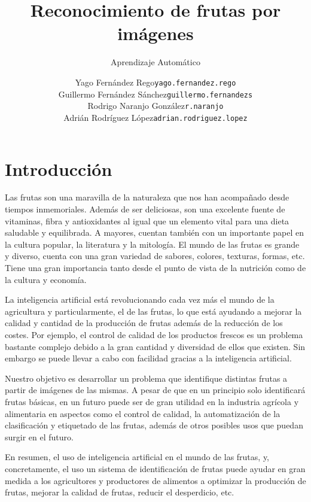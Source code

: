 \documentclass[a4paper, 12pt]{scrarticle}
\title{Reconocimiento de frutas por imágenes}
\author{
\small
    \begin{tabular}{r l}
         Yago Fernández Rego & \texttt{yago.fernandez.rego} \\
         Guillermo Fernández Sánchez &  \texttt{guillermo.fernandezs} \\
         Rodrigo Naranjo González & \texttt{r.naranjo} \\
         Adrián Rodríguez López & \texttt{adrian.rodriguez.lopez} 
    \end{tabular}
}
\subtitle{Aprendizaje Automático}
\begin{document}
\maketitle
\newpage
\tableofcontents
\newpage
    
\section{Introducción}
    Las frutas son una maravilla de la naturaleza que nos han acompañado desde tiempos inmemoriales. Además de ser deliciosas, son una excelente fuente de vitaminas, fibra y antioxidantes al igual que un elemento vital para una dieta saludable y equilibrada. A mayores, cuentan también con un importante papel en la cultura popular, la literatura y la mitología.  El mundo de las frutas es grande y diverso, cuenta con una gran variedad de sabores, colores, texturas, formas, etc. Tiene una gran importancia tanto desde el punto de vista de la nutrición como de la cultura y economía. \\\par
    
    La inteligencia artificial está revolucionando cada vez más el mundo de la agricultura y particularmente, el de las frutas, lo que está ayudando a mejorar la calidad y cantidad de la producción de frutas además de la reducción de los costes. Por ejemplo, el control de calidad de los productos frescos es un problema bastante complejo debido a la gran cantidad y diversidad de ellos que existen. Sin embargo se puede llevar a cabo con facilidad gracias a la inteligencia artificial. \\ \par
    
    Nuestro objetivo es desarrollar un problema que identifique distintas frutas a partir de imágenes de las mismas. A pesar de que en un principio solo identificará frutas básicas, en un futuro puede ser de gran utilidad en la industria agrícola y alimentaria en aspectos como el control de calidad, la automatización de la clasificación y etiquetado de las frutas, además de otros posibles usos que puedan surgir en el futuro. \\ \par 

    En resumen, el uso de inteligencia artificial en el mundo de las frutas, y, concretamente, el uso un sistema de identificación de frutas puede ayudar en gran medida a los agricultores y productores de alimentos a optimizar la producción de frutas, mejorar la calidad de frutas, reducir el desperdicio, etc.  \\ \par 
\end{document}
